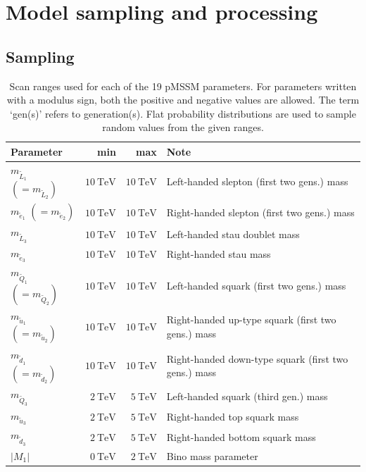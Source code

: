 \section{Model sampling and processing}\label{sec:pmssm_sampling}


\subsection{Sampling}

\begin{table}
	\centering
	\small
	\caption{Scan ranges used for each of the 19 pMSSM parameters. For parameters written with a modulus sign, both the positive and negative values are allowed. The term `gen(s)' refers to generation(s). Flat probability distributions are used to sample random values from the given ranges.}
	\setlength\heavyrulewidth{0.2ex}
	\begin{tabular} {l r r l}
		\toprule
		Parameter & min & max & Note \\ 
		\midrule
		$m_{\tilde{L}_1}$ $(=m_{\tilde{L}_2})$ & $\SI{10}{\TeV}$ & $\SI{10}{\TeV}$ & Left-handed slepton (first two gens.) mass \\
		$m_{\tilde{e}_1}$ $(=m_{\tilde{e}_2})$ & $\SI{10}{\TeV}$ & $\SI{10}{\TeV}$ & Right-handed slepton (first two gens.) mass \\ 
		$m_{\tilde{L}_3}$ & $\SI{10}{\TeV}$ & $\SI{10}{\TeV}$ & Left-handed stau doublet mass \\
		$m_{\tilde{e}_3}$ & $\SI{10}{\TeV}$ & $\SI{10}{\TeV}$ & Right-handed stau mass \\
		\midrule
		$m_{\tilde{Q}_1}$ $(=m_{\tilde{Q}_2})$ & $\SI{10}{\TeV}$ & $\SI{10}{\TeV}$ & Left-handed squark (first two gens.) mass \\
		$m_{\tilde{u}_1}$ $(=m_{\tilde{u}_2})$ & $\SI{10}{\TeV}$ & $\SI{10}{\TeV}$ & Right-handed up-type squark (first two gens.) mass \\
		$m_{\tilde{d}_1}$ $(=m_{\tilde{d}_2})$ &$\SI{10}{\TeV}$ & $\SI{10}{\TeV}$ & Right-handed down-type squark (first two gens.) mass \\
		$m_{\tilde{Q}_3}$ & $\SI{2}{\TeV}$ & $\SI{5}{\TeV}$ & Left-handed squark (third gen.) mass \\
		$m_{\tilde{u}_3}$ & $\SI{2}{\TeV}$ & $\SI{5}{\TeV}$ & Right-handed top squark mass \\
		$m_{\tilde{d}_3}$ & $\SI{2}{\TeV}$ & $\SI{5}{\TeV}$ & Right-handed bottom squark mass \\
		\midrule
		$\vert M_1\vert$ & $\SI{0}{\TeV}$ & $\SI{2}{\TeV}$ & Bino mass parameter \\

\end{tabular}
\end{table}
